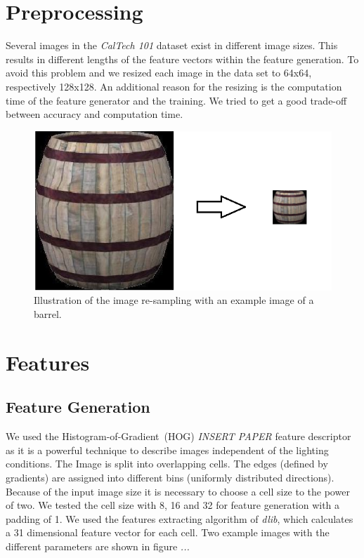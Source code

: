 \documentclass[a4paper,10pt]{article}
\begin{document}
\section{Preprocessing}
\label{sec:preprocessing}
Several images in the \emph{CalTech 101} dataset exist in different image sizes. 
This results in different lengths of the feature vectors within the feature generation.
To avoid this problem and we resized each image in the data set to 64x64, respectively 128x128.
An additional reason for the resizing is the computation time of the feature generator and the training. 
We tried to get a good trade-off between accuracy and computation time.
\begin{figure}[ht]
\centering
\includegraphics[scale=0.5]{images/preprocessing.png}
\caption{Illustration of the image re-sampling with an example image of a barrel.}
\label{fig:resize}
\end{figure}

\section{Features}
\subsection{Feature Generation}

We used the Histogram-of-Gradient~(HOG) \emph{INSERT PAPER} feature descriptor as it is a powerful technique to describe images independent of the lighting conditions. 
The Image is split into overlapping cells. The edges (defined by gradients) are assigned into different bins (uniformly distributed directions).
Because of the input image size it is necessary to choose a cell size to the power of two. 
We tested the cell size with 8, 16 and 32 for feature generation with a padding of 1.
We used the features extracting algorithm of \emph{dlib}, which calculates a 31 dimensional feature vector for each cell.
Two example images with the different parameters are shown in figure \emph{...}
\end{document}
